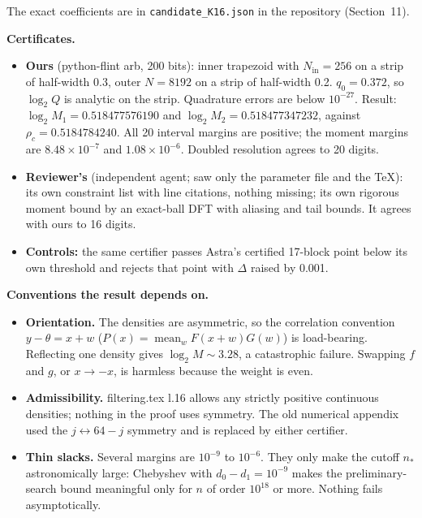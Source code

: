 \documentclass[11pt]{article}
\DeclareMathOperator{\mean}{mean}
\theoremstyle{plain}
\begin{document}
The exact coefficients are in \texttt{candidate\_K16.json} in the repository (Section~11).

\textbf{Certificates.}

\begin{itemize}
\item \textbf{Ours} (python-flint arb, 200 bits): inner trapezoid with $N_{\mathrm{in}} = 256$ on a strip of half-width 0.3, outer $N = 8192$ on a strip of half-width 0.2. $q_0 = 0.372$, so $\log_2 Q$ is analytic on the strip. Quadrature errors are below $10^{-27}$. Result: $\log_2 M_1 = 0.518477576190$ and $\log_2 M_2 = 0.518477347232$, against $\rho_c = 0.5184784240$. All 20 interval margins are positive; the moment margins are $8.48\times10^{-7}$ and $1.08\times10^{-6}$. Doubled resolution agrees to 20 digits.
\item \textbf{Reviewer's} (independent agent; saw only the parameter file and the TeX): its own constraint list with line citations, nothing missing; its own rigorous moment bound by an exact-ball DFT with aliasing and tail bounds. It agrees with ours to 16 digits.
\item \textbf{Controls:} the same certifier passes Astra's certified 17-block point below its own threshold and rejects that point with $\Delta$ raised by 0.001.
\end{itemize}

\textbf{Conventions the result depends on.}

\begin{itemize}
\item \textbf{Orientation.} The densities are asymmetric, so the correlation convention $y - \theta = x + w$ ($P(x) = \mean_w F(x+w)G(w)$) is load-bearing. Reflecting one density gives $\log_2 M \sim 3.28$, a catastrophic failure. Swapping $f$ and $g$, or $x \to -x$, is harmless because the weight is even.
\item \textbf{Admissibility.} filtering.tex l.16 allows any strictly positive continuous densities; nothing in the proof uses symmetry. The old numerical appendix used the $j \leftrightarrow 64-j$ symmetry and is replaced by either certifier.
\item \textbf{Thin slacks.} Several margins are $10^{-9}$ to $10^{-6}$. They only make the cutoff $n_*$ astronomically large: Chebyshev with $d_0 - d_1 = 10^{-9}$ makes the preliminary-search bound meaningful only for $n$ of order $10^{18}$ or more. Nothing fails asymptotically.
\end{itemize}
\end{document}
